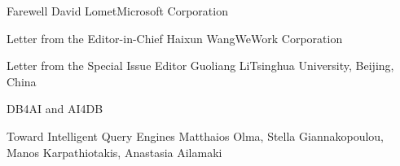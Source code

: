 \documentclass[11pt]{article}
\begin{document}


\begin{bulletin}

%
%

\begin{lettersection}


\begin{letter}{Farewell}
{David Lomet}{Microsoft Corporation}

\end{letter}
\newpage
\begin{letter}{Letter from the Editor-in-Chief}
{Haixun Wang}{WeWork Corporation}

\end{letter}
%
\newpage
%
%

\begin{letter}{Letter from the Special Issue Editor}
{Guoliang Li}{Tsinghua University, Beijing, China}
\graphicspath{{letters/}}

\end{letter}

\end{lettersection}



\begin{articlesection}{DB4AI and AI4DB}
%
%
%
\begin{article}
{Toward Intelligent Query Engines}
{Matthaios Olma,  Stella Giannakopoulou,  Manos Karpathiotakis, Anastasia Ailamaki}
\graphicspath{{submissions/adaptivedb/}}

\end{article}



\end{articlesection}
\end{bulletin}
\end{document}
